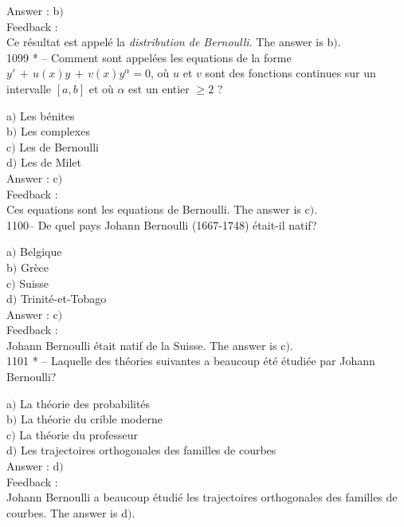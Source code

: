 \documentclass[letterpaper, 12pt]{article}
\begin{document}
Answer : b$)$\\

Feedback : \\
Ce r\'esultat est appel\'e la {\sl distribution de Bernoulli}.
The answer is b$)$.\\

1099 * -- Comment sont appel\'ees les equations de la forme
$y'\,+\,u(x)y\,+\,v(x)y^{\alpha}=0$, o\`u $u$ et $v$ sont des
fonctions continues sur un intervalle $[a,b]$ et o\`u $\alpha$ est
un entier $\ge2$ ?

a$)$ Les {\slequations b\'enites} \\
b$)$ Les {\slequations complexes}  \\
c$)$ Les {\slequations de Bernoulli}  \\
d$)$ Les {\slequations de Milet}\\

Answer : c$)$\\

Feedback : \\
Ces equations sont les equations de Bernoulli.
The answer is c$)$.\\

1100-- De quel pays Johann Bernoulli (1667-1748) \'etait-il natif?

a$)$ Belgique \\
b$)$ Gr\`ece  \\
c$)$ Suisse  \\
d$)$ Trinit\'e-et-Tobago \\

Answer : c$)$\\

Feedback : \\
Johann Bernoulli \'etait natif de la Suisse.
The answer is c$)$.\\

1101 * -- Laquelle des th\'eories suivantes a beaucoup \'et\'e
\'etudi\'ee par Johann Bernoulli?

a$)$ La th\'eorie des probabilit\'es \\
b$)$ La th\'eorie du crible moderne  \\
c$)$ La th\'eorie du professeur  \\
d$)$ Les trajectoires orthogonales des familles de courbes\\

Answer : d$)$\\

Feedback : \\
Johann Bernoulli a beaucoup \'etudi\'e les trajectoires orthogonales
des familles de courbes.
The answer is d$)$.\\
\end{document}
